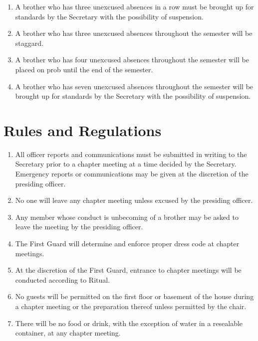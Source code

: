 	\begin{enumerate}

		\item A brother who has three unexcused absences in a row must be brought up for standards by the Secretary with the possibility of suspension.

		\item A brother who has three unexcused absences throughout the semester will be \gls{staggard}.

		\item A brother who has four unexcused absences throughout the semester will be placed on \gls{prob} until the end of the semester.

		\item A brother who has seven unexcused absences throughout the semester will be brought up for standards by the Secretary with the possibility of suspension. 

	\end{enumerate}

\section{Rules and Regulations}

	\begin{enumerate}
		\item All officer reports and communications must be submitted in writing to the Secretary prior to a chapter meeting at a time decided by the Secretary. Emergency reports or communications may be given at the discretion of the presiding officer.
		\item No one will leave any chapter meeting unless excused by the presiding officer.

		\item Any member whose conduct is unbecoming of a brother may be asked to leave the meeting by the presiding officer.

		\item The First Guard will determine and enforce proper dress code at chapter meetings. \label{chapter-dress}

		\item At the discretion of the First Guard, entrance to chapter meetings will be conducted according to Ritual.

		\item No guests will be permitted on the first floor or basement of the house during a chapter meeting or the preparation thereof unless permitted by the chair.
		
        \item There will be no food or drink, with the exception of water in a resealable container, at any chapter meeting.

	\end{enumerate}
